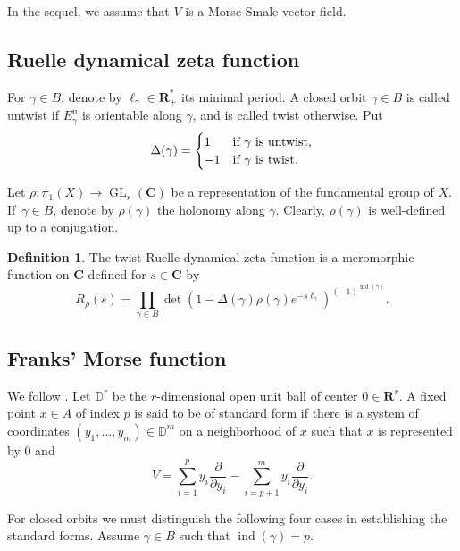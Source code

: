 \documentclass[JEP,XML,SOM,Unicode]{cedram}
\newcommand{\ru}{\mathrm{u}}
\theoremstyle{plain}
\theoremstyle{definition}
\newtheorem{defin}[lem]{Definition}
\theoremstyle{remark}
\newcommand{\bR}{\mathbf{R}}
\newcommand{\bC}{\mathbf{C}}
\newcommand{\bbD}{\mathbb{D}}
\DeclareMathOperator{\ind}{ind}
\DeclareMathOperator{\GL}{GL}
\let\p\partial
\begin{document}
In the sequel, we assume
that $V$ is a
Morse-Smale vector field.

\subsection{Ruelle dynamical zeta function}\label{sDZf}
For $\gamma\in B$, denote by $\ell_{\gamma}\in \bR^{*}_{+}$ its
minimal period. A closed orbit $\gamma\in B$
is called untwist if $E^{\ru}_{\gamma}$ is orientable along $\gamma$, and is
called twist otherwise. Put
\begin{equation}\label{Delta}
\Delta(\gamma)=
\begin{cases}
1&\hbox{if } \gamma \hbox{ is untwist},\\
-1&\hbox{if } \gamma \hbox{ is twist}.
\end{cases}
\end{equation}

Let $\rho:\pi_{1}(X)\to \GL_{r}(\bC)$ be a representation of the fundamental group of $X$. If~$\gamma\in B$, denote by $\rho(\gamma)$
the holonomy along $\gamma$. Clearly, $\rho(\gamma)$ is well-defined up to a conjugation.

\begin{defin} The twist Ruelle dynamical zeta function is a meromorphic
function on $\bC$ defined for $s\in \bC$ by
\begin{equation}\label{rrs}
R_{\rho}(s)=\prod_{\gamma\in
B}\det(1-\Delta(\gamma)\rho(\gamma)e^{-s
\ell_\gamma})^{(-1)^{\ind(\gamma)}}.
\end{equation}
\end{defin}

\subsection{Franks' Morse function}\label{sMSMF}
We follow \cite[\S 1]{Franks1979}. Let $\bbD^{r}$ be the
$r$-dimensional open unit ball of center $0\in
\bR^{r}$.
A fixed point $x\in A$ of index $p$ is said to be of standard form if there is a system of coordinates $(y_{1},\ldots, y_{m})\in \bbD^{m}$ on a neighborhood
of $x$ such that $x$ is represented by $0$ and
\begin{equation*}
V=\sum_{i=1}^{p}y_{i}\frac{\p}{\p
y_{i}}-\sum_{i=p+1}^{m}y_{i}\frac{\p}{\p y_{i}}.
\end{equation*}

For closed orbits we must distinguish the following four cases in
establishing the standard forms. Assume $\gamma\in B$ such that
$\ind(\gamma)=p$.
\end{document}
